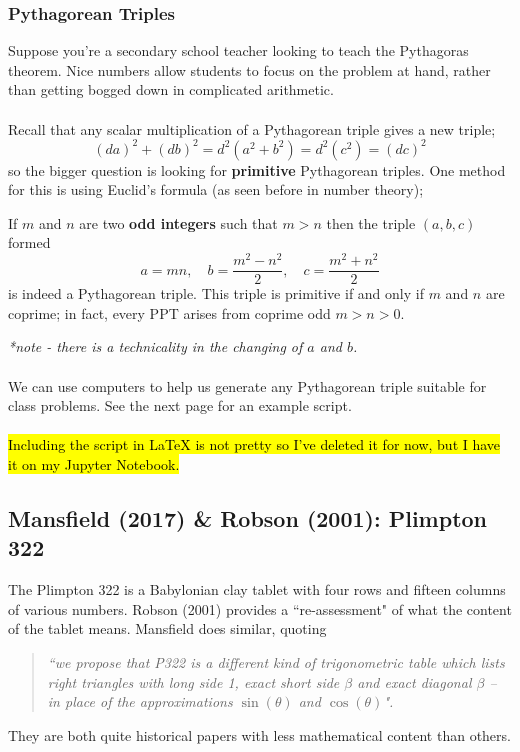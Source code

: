\documentclass[12pt]{article}
\begin{document}
\subsubsection{Pythagorean Triples}
Suppose you're a secondary school teacher looking to teach the Pythagoras theorem. Nice numbers allow students to focus on the problem at hand, rather than getting bogged down in complicated arithmetic.\\\\
Recall that any scalar multiplication of a Pythagorean triple gives a new triple;
\begin{equation*}
    (da)^2 + (db)^2 = d^2(a^2 + b^2) = d^2(c^2) = (dc)^2
\end{equation*}
so the bigger question is looking for \textbf{primitive} Pythagorean triples. One method for this is using Euclid's formula (as seen before in number theory);
\begin{thm}{}{}
If $m$ and $n$ are two \textbf{odd integers} such that $m > n$ then the triple $(a, b, c)$ formed
\begin{equation*}
    a = mn,\quad b = \frac{m^2 - n^2}{2},\quad c = \frac{m^2 + n^2}{2}
\end{equation*}
is indeed a Pythagorean triple. This triple is primitive if and only if $m$ and $n$ are coprime; in fact, every PPT arises from coprime odd $m > n > 0$.
\end{thm}
\textit{*note - there is a technicality in the changing of $a$ and $b$.}\\\\
We can use computers to help us generate any Pythagorean triple suitable for class problems. See the next page for an example script.\\\\
\hl{Including the script in \LaTeX{} is not pretty so I've deleted it for now, but I have it on my Jupyter Notebook.}

\subsection{Mansfield (2017) \& Robson (2001): Plimpton 322}
The Plimpton 322 is a Babylonian clay tablet with four rows and fifteen columns of various numbers. Robson (2001) provides a ``re-assessment" of what the content of the tablet means. Mansfield does similar, quoting
\begin{quote}
    \textit{``we propose that P322 is a different kind of trigonometric table which lists right triangles with long side 1, exact short side $\beta$ and exact diagonal $\beta$ – in place of the approximations $\sin(\theta)$ and $\cos(\theta)$".}
\end{quote}
They are both quite historical papers with less mathematical content than others.
\end{document}
